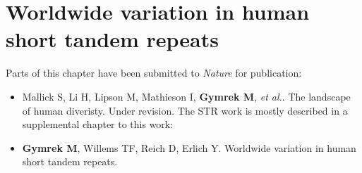 \iffalse  \fi

\chapter{Worldwide variation in human short tandem repeats}

\hzline

Parts of this chapter have been submitted to \emph{Nature} for publication:
\begin{itemize}
\item[] Mallick S, Li H, Lipson M, Mathieson I, \textbf{Gymrek M}, \emph{et al.}. The landscape of human diveristy. Under revision. The STR work is mostly described in a supplemental chapter to this work:
\item[] \textbf{Gymrek M}, Willems TF, Reich D, Erlich Y. Worldwide variation in human short tandem repeats. 
\end{itemize}
\hzline
